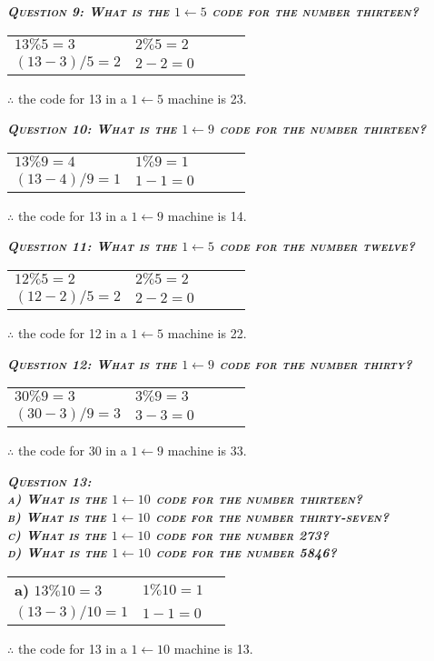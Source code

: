 \documentclass{article}
\begin{document}
\textbf{\emph{\textsc{Question 9: What is the $1 \leftarrow 5$ code for the number thirteen?}}}

\begin{tabular}{l l l l l}
    $13\%5=3$ & $2\%5=2$
    & \\
    $(13-3)/5=2$ & $2-2=0$
\end{tabular}
$\therefore$ the code for 13 in a $1 \leftarrow 5$ machine is 23.

\textbf{\emph{\textsc{Question 10: What is the $1 \leftarrow 9$ code for the number thirteen?}}}

\begin{tabular}{l l l l l}
    $13\%9=4$ & $1\%9=1$
    & \\
    $(13-4)/9=1$ & $1-1=0$
\end{tabular}
$\therefore$ the code for 13 in a $1 \leftarrow 9$ machine is 14.

\textbf{\emph{\textsc{Question 11: What is the $1 \leftarrow 5$ code for the number twelve?}}}

\begin{tabular}{l l l l l}
    $12\%5=2$ & $2\%5=2$
    & \\
    $(12-2)/5=2$ & $2-2=0$
\end{tabular}
$\therefore$ the code for 12 in a $1 \leftarrow 5$ machine is 22.

\textbf{\emph{\textsc{Question 12: What is the $1 \leftarrow 9$ code for the number thirty?}}}

\begin{tabular}{l l l l l}
    $30\%9=3$ & $3\%9=3$
    & \\
    $(30-3)/9=3$ & $3-3=0$
\end{tabular}
$\therefore$ the code for 30 in a $1 \leftarrow 9$ machine is 33.

\newpage

\textbf{\emph{\textsc{Question 13: \\
a) What is the $1 \leftarrow 10$ code for the number thirteen? \\
b) What is the $1 \leftarrow 10$ code for the number thirty-seven? \\
c) What is the $1 \leftarrow 10$ code for the number 273? \\
d) What is the $1 \leftarrow 10$ code for the number 5846?}}}

\begin{tabular}{l l l}
    \textbf{a)} $13\%10=3$ & $1\%10=1$
    & \\
    $(13-3)/10=1$ & $1-1=0$
\end{tabular}
$\therefore$ the code for 13 in a $1 \leftarrow 10$ machine is 13.
\end{document}
